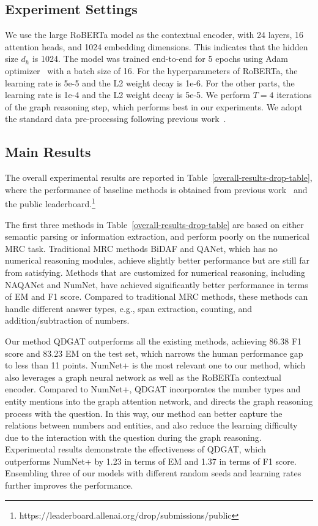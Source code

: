 \documentclass{article}
\begin{document}
\subsection{Experiment Settings}
We use the large RoBERTa model as the contextual encoder, with 24 layers, 16 attention heads, and 1024 embedding dimensions.
This indicates that the hidden size $d_h$ is 1024.
The model was trained end-to-end for 5 epochs using Adam optimizer~\cite{DBLP:journals/corr/KingmaB14} with a batch size of 16.
For the hyperparameters of RoBERTa, the learning rate is 5e-5 and the L2 weight decay is 1e-6.
For the other parts, the learning rate is 1e-4 and the L2 weight decay is 5e-5.
We perform $T=4$ iterations of the graph reasoning step, which performs best in our experiments.
We adopt the standard data pre-processing following previous work~\cite{DBLP:conf/emnlp/RanLLZL19}.


\subsection{Main Results}
The overall experimental results are reported in Table~\ref{overall-results-drop-table}, where the performance of baseline methods is obtained from previous work~\cite{DBLP:conf/naacl/DuaWDSS019,Seo2017Bidirectional,DBLP:conf/emnlp/RanLLZL19,DBLP:conf/emnlp/AndorHLP19} and
the public leaderboard.\footnote{https://leaderboard.allenai.org/drop/submissions/public}

The first three methods in Table~\ref{overall-results-drop-table} are based on either semantic parsing or information extraction, and perform poorly on the numerical MRC task.
Traditional MRC methods BiDAF and QANet, which has no numerical reasoning modules, achieve slightly better performance but are still far from satisfying.
Methods that are customized for numerical reasoning, including NAQANet and NumNet, have achieved significantly better performance in terms of EM and F1 score. Compared to traditional MRC methods, these methods can handle different answer types, e.g., span extraction, counting, and addition/subtraction of numbers.




Our method QDGAT outperforms all the existing methods, achieving 86.38 F1 score and 83.23 EM on the test set, which narrows the human performance gap to less than 11 points.
NumNet+ is the most relevant one to our method, which also leverages a graph neural network as well as the RoBERTa contextual encoder. Compared to NumNet+, QDGAT incorporates the number types and entity mentions into the graph attention network, and directs the graph reasoning process with the question. In this way, our method can better capture the relations between numbers and entities, and also reduce the learning difficulty due to the interaction with the question during the graph reasoning.
Experimental results demonstrate the effectiveness of QDGAT, which outperforms NumNet+ by 1.23 in terms of EM and 1.37 in terms of F1 score.
Ensembling three of our models with different random seeds and learning rates further improves the performance.
\end{document}
